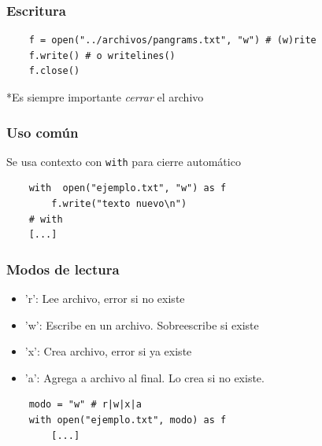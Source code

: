 \documentclass[14pt,aspectratio=169,xcolor=dvipsnames]{beamer}
\begin{document}
\begin{frame}[fragile]\frametitle{Escritura}
    \begin{verbatim}
    f = open("../archivos/pangrams.txt", "w") # (w)rite
    f.write() # o writelines()
    f.close()
    \end{verbatim}

*Es siempre importante \emph{cerrar} el archivo
\end{frame}
\begin{frame}[fragile]\frametitle{Uso común}
    Se usa contexto con {\color{purple}\texttt{with}} para cierre automático
    \begin{verbatim}
    with  open("ejemplo.txt", "w") as f
        f.write("texto nuevo\n") 
    # with
    [...]
    \end{verbatim}
\end{frame}
\begin{frame}[fragile]\frametitle{Modos de lectura}
    \begin{itemize}
        \item 'r': Lee archivo, error si no existe
        \item 'w': Escribe en un archivo. Sobreescribe si existe
        \item 'x': Crea archivo, error si ya existe
        \item 'a': Agrega a archivo al final. Lo crea si no existe.

    \end{itemize}
    
    \vspace{1cm}
    \begin{verbatim}
    modo = "w" # r|w|x|a
    with open("ejemplo.txt", modo) as f
        [...]
    \end{verbatim}
\end{frame}
\begin{frame}


\end{frame}
\end{document}
